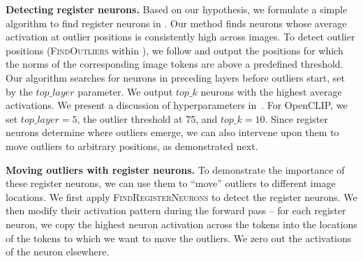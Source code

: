 \documentclass{article}
\begin{document}
\textbf{Detecting register neurons.} Based on our hypothesis, we formulate a simple algorithm to find register neurons in . Our method finds neurons whose average activation at outlier positions is consistently high across images. To detect outlier positions (\textsc{FindOutliers} within ), we follow \cite{darcet2024vision} and output the positions for which the norms of the corresponding image tokens are above a predefined threshold. Our algorithm searches for neurons in preceding layers before outliers start, set by the $top\_layer$ parameter. We output $top\_k$ neurons with the highest average activations. We present a discussion of hyperparameters in~. For OpenCLIP, we set $top\_layer = 5$, the outlier threshold at 75, and $top\_k = 10$. Since register neurons determine where outliers emerge, we can also intervene upon them to move outliers to arbitrary positions, as demonstrated next. 

\textbf{Moving outliers with register neurons.} To demonstrate the importance of these register neurons, we can use them to ``move'' outliers to different image locations. We first apply \textsc{FindRegisterNeurons} to detect the register neurons. We then modify their activation pattern during the forward pass -- for each register neuron, we copy the highest neuron activation across the tokens into the locations of the tokens to which we want to move the outliers. We zero out the activations of the neuron elsewhere.





\end{document}
